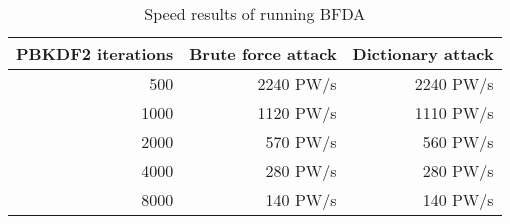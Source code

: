 \begin{table}[!h]
    \centering
    \caption{Speed results of running \ac{BFDA}}
    \label{tab:res_bf}
    \begin{tabular}{| r | r | r |}
	\hline
	\ac{PBKDF2} iterations          &Brute force attack	    &Dictionary attack	\\
	\hline
	500                             &2240 PW/s                &2240 PW/s	\\
	\hline
	1000                            &1120 PW/s                &1110 PW/s	\\
	\hline
	2000                            &570 PW/s                 &560 PW/s	\\
	\hline
	4000                            &280 PW/s                 &280 PW/s	\\
	\hline
    8000                            &140 PW/s                 &140 PW/s \\
    \hline
    \end{tabular}
\end{table}
